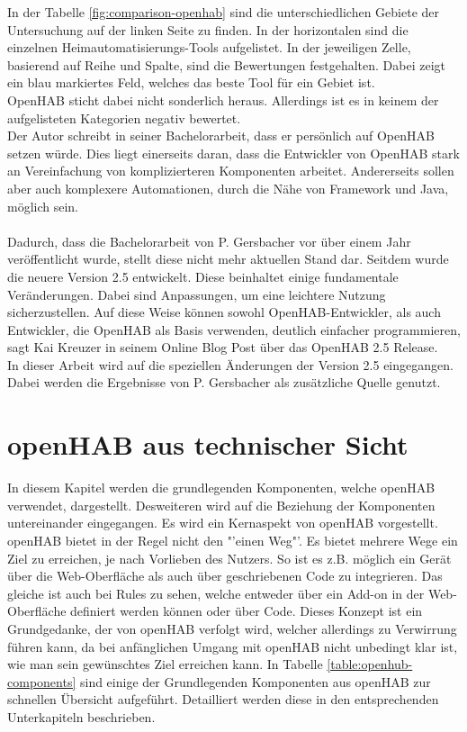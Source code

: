 In der Tabelle \ref{fig:comparison-openhab} sind die unterschiedlichen Gebiete der Untersuchung auf der linken Seite zu finden. In der horizontalen sind die einzelnen Heimautomatisierungs-Tools aufgelistet. In der jeweiligen Zelle, basierend auf Reihe und Spalte, sind die Bewertungen festgehalten. Dabei zeigt ein blau markiertes Feld, welches das beste Tool für ein Gebiet ist.\\
OpenHAB sticht dabei nicht sonderlich heraus. Allerdings ist es in keinem der aufgelisteten Kategorien negativ bewertet.\\
Der Autor schreibt in seiner Bachelorarbeit, dass er persönlich auf OpenHAB setzen würde. Dies liegt einerseits daran, dass die Entwickler von OpenHAB stark an Vereinfachung von komplizierteren Komponenten arbeitet. Andererseits sollen aber auch komplexere Automationen, durch die Nähe von Framework und Java, möglich sein.\cite{BA01:OPH}
\\
\\
Dadurch, dass die Bachelorarbeit von P. Gersbacher vor über einem Jahr veröffentlicht wurde, stellt diese nicht mehr aktuellen Stand dar. Seitdem wurde die neuere Version 2.5 entwickelt. Diese beinhaltet einige fundamentale Veränderungen. Dabei sind Anpassungen, um eine leichtere Nutzung sicherzustellen. Auf diese Weise können sowohl OpenHAB-Entwickler, als auch Entwickler, die OpenHAB als Basis verwenden, deutlich einfacher programmieren, sagt Kai Kreuzer in seinem Online Blog Post über das OpenHAB 2.5 Release.\cite{OPENHAB02:OH}\\
In dieser Arbeit wird auf die speziellen Änderungen der Version 2.5 eingegangen. Dabei werden die Ergebnisse von P. Gersbacher als zusätzliche Quelle genutzt.


\section{openHAB aus technischer Sicht}\label{sec:technischeSicht}
In diesem Kapitel werden die grundlegenden Komponenten, welche openHAB verwendet, dargestellt. Desweiteren wird auf die  Beziehung der Komponenten untereinander eingegangen. 
Es wird ein Kernaspekt von openHAB vorgestellt. openHAB bietet in der Regel nicht den "'einen Weg"'. Es bietet mehrere Wege ein Ziel zu erreichen, je nach Vorlieben des Nutzers. So ist es z.B. möglich ein Gerät über die Web-Oberfläche als auch über geschriebenen Code zu integrieren. Das gleiche ist auch bei Rules zu sehen, welche entweder über ein Add-on in der Web-Oberfläche definiert werden können oder über Code. Dieses Konzept ist ein Grundgedanke, der von openHAB verfolgt wird, welcher allerdings zu Verwirrung führen kann, da bei anfänglichen Umgang mit openHAB nicht unbedingt klar ist, wie man sein gewünschtes Ziel erreichen kann.
In Tabelle \ref{table:openhub-components} sind einige der Grundlegenden Komponenten aus openHAB zur schnellen Übersicht aufgeführt. Detailliert werden diese in den entsprechenden Unterkapiteln beschrieben.

